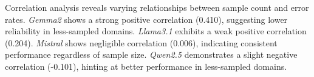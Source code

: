 Correlation analysis reveals varying relationships between sample count and error rates.
\textit{Gemma2} shows a strong positive correlation (0.410), suggesting lower reliability in less-sampled domains.
\textit{Llama3.1} exhibits a weak positive correlation (0.204).
\textit{Mistral} shows negligible correlation (0.006), indicating consistent performance regardless of sample size.
\textit{Qwen2.5} demonstrates a slight negative correlation (-0.101), hinting at better performance in less-sampled domains.